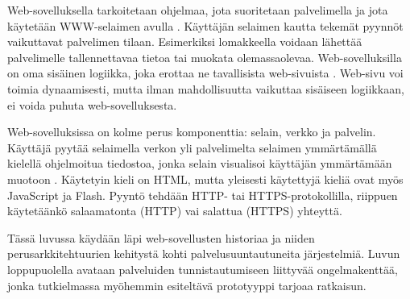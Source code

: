 Web-sovelluksella tarkoitetaan ohjelmaa, jota suoritetaan palvelimella ja jota käytetään WWW-selaimen avulla \cite{uml}. Käyttäjän selaimen kautta tekemät pyynnöt vaikuttavat palvelimen tilaan. Esimerkiksi lomakkeella voidaan lähettää palvelimelle tallennettavaa tietoa tai muokata olemassaolevaa. Web-sovelluksilla on oma sisäinen logiikka, joka erottaa ne tavallisista web-sivuista \cite{uml}. Web-sivu voi toimia dynaamisesti, mutta ilman mahdollisuutta vaikuttaa sisäiseen logiikkaan, ei voida puhuta web-sovelluksesta.

Web-sovelluksissa on kolme perus komponenttia: selain, verkko ja palvelin. Käyttäjä pyytää selaimella verkon yli palvelimelta selaimen ymmärtämällä kielellä ohjelmoitua tiedostoa, jonka selain visualisoi käyttäjän ymmärtämään muotoon \cite{uml}. Käytetyin kieli on HTML, mutta yleisesti käytettyjä kieliä ovat myös JavaScript ja Flash. Pyyntö tehdään HTTP- tai HTTPS-protokollilla, riippuen käytetäänkö salaamatonta (HTTP) vai salattua (HTTPS) yhteyttä.

Tässä luvussa käydään läpi web-sovellusten historiaa ja niiden perusarkkitehtuurien kehitystä kohti palvelusuuntautuneita järjestelmiä. Luvun loppupuolella avataan palveluiden tunnistautumiseen liittyvää ongelmakenttää, jonka tutkielmassa myöhemmin esiteltävä prototyyppi tarjoaa ratkaisun.